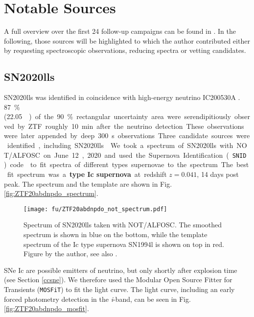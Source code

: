 \section{Notable Sources}
A full overview over the first 24 follow-up campaigns can be found in . In the following, those sources will be highlighted to which the author contributed either by requesting spectroscopic observations, reducing spectra or vetting candidates.

\subsection{SN2020lls} \label{SN2020lls}
SN2020lls was identified in coincidence with high-energy neutrino IC200530A . \SI{87}{\percent} (\SI{22.05}{\square\deg}) of the \SI{90}{\percent} rectangular uncertainty area were serendipitiously observed by ZTF roughly \SI{10}{\minute} after the neutrino detection. These observations were later appended by deep \SI{300}{\second} observations Three candidate sources were identified, including SN2020lls . 

We took a spectrum of SN2020lls with NOT/ALFOSC on June 12, 2020 and used the Supernova Identification (\texttt{SNID}) code  to fit spectra of different types supernovae to the spectrum. The best fit spectrum was a \textbf{type Ic supernova} at redshift $z=0.041$, 14 days post peak. The spectrum and the template are shown in Fig. \ref{fig:ZTF20abdnpdo_spectrum}. 

\begin{figure}[h!]
    \texttt{[image: fu/ZTF20abdnpdo\_not\_spectrum.pdf]}
    \caption[SN2020lls spectrum]{Spectrum of SN2020lls taken with NOT/ALFOSC. The smoothed spectrum is shown in blue on the bottom, while the template spectrum of the Ic type supernova SN1994l is shown on top in red. Figure by the author, see also \cite{Stein2023a}.}
\end{figure}
SNe Ic are possible emitters of neutrino, but only shortly after explosion time (see Section \ref{ccsne}). We therefore used the Modular Open Source Fitter for Transients (\texttt{MOSFiT})  to fit the light curve. The light curve, including an early forced photometry detection in the \textit{i}-band, can be seen in Fig. \ref{fig:ZTF20abdnpdo_mosfit}.

